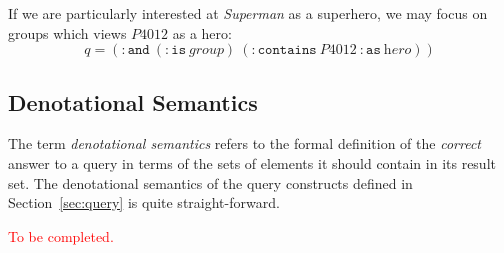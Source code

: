 \documentclass{article}
\begin{document}
If we are particularly interested at {\em Superman} as a superhero, we may focus
on groups which views $P4012$ as a hero:
$$q = 
  (\mathtt{:and}
   \ (\mathtt{:is}\ \textit{group})
   \ (\mathtt{:contains}\ P4012\ \mathtt{:as}\ \textit{hero})) $$

\subsection{Denotational Semantics}
The term {\em denotational semantics} refers to the formal definition of the
{\em correct} answer to a query in terms of the sets of elements it should
contain in its result set.  The denotational semantics of the query constructs
defined in Section~\ref{sec:query} is quite straight-forward.

\textcolor{red}{To be completed.}
\end{document}
